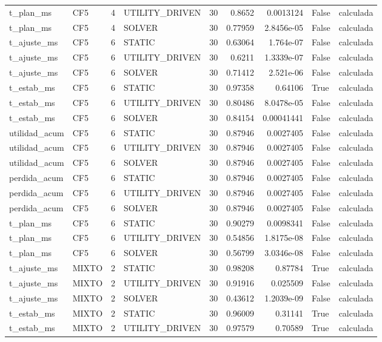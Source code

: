 \begin{tabular}{llrlrrrll}
t_plan_ms & CF5 & 4 & UTILITY_DRIVEN & 30 & 0.8652 & 0.0013124 & False & calculada \\
t_plan_ms & CF5 & 4 & SOLVER & 30 & 0.77959 & 2.8456e-05 & False & calculada \\
t_ajuste_ms & CF5 & 6 & STATIC & 30 & 0.63064 & 1.764e-07 & False & calculada \\
t_ajuste_ms & CF5 & 6 & UTILITY_DRIVEN & 30 & 0.6211 & 1.3339e-07 & False & calculada \\
t_ajuste_ms & CF5 & 6 & SOLVER & 30 & 0.71412 & 2.521e-06 & False & calculada \\
t_estab_ms & CF5 & 6 & STATIC & 30 & 0.97358 & 0.64106 & True & calculada \\
t_estab_ms & CF5 & 6 & UTILITY_DRIVEN & 30 & 0.80486 & 8.0478e-05 & False & calculada \\
t_estab_ms & CF5 & 6 & SOLVER & 30 & 0.84154 & 0.00041441 & False & calculada \\
utilidad_acum & CF5 & 6 & STATIC & 30 & 0.87946 & 0.0027405 & False & calculada \\
utilidad_acum & CF5 & 6 & UTILITY_DRIVEN & 30 & 0.87946 & 0.0027405 & False & calculada \\
utilidad_acum & CF5 & 6 & SOLVER & 30 & 0.87946 & 0.0027405 & False & calculada \\
perdida_acum & CF5 & 6 & STATIC & 30 & 0.87946 & 0.0027405 & False & calculada \\
perdida_acum & CF5 & 6 & UTILITY_DRIVEN & 30 & 0.87946 & 0.0027405 & False & calculada \\
perdida_acum & CF5 & 6 & SOLVER & 30 & 0.87946 & 0.0027405 & False & calculada \\
t_plan_ms & CF5 & 6 & STATIC & 30 & 0.90279 & 0.0098341 & False & calculada \\
t_plan_ms & CF5 & 6 & UTILITY_DRIVEN & 30 & 0.54856 & 1.8175e-08 & False & calculada \\
t_plan_ms & CF5 & 6 & SOLVER & 30 & 0.56799 & 3.0346e-08 & False & calculada \\
t_ajuste_ms & MIXTO & 2 & STATIC & 30 & 0.98208 & 0.87784 & True & calculada \\
t_ajuste_ms & MIXTO & 2 & UTILITY_DRIVEN & 30 & 0.91916 & 0.025509 & False & calculada \\
t_ajuste_ms & MIXTO & 2 & SOLVER & 30 & 0.43612 & 1.2039e-09 & False & calculada \\
t_estab_ms & MIXTO & 2 & STATIC & 30 & 0.96009 & 0.31141 & True & calculada \\
t_estab_ms & MIXTO & 2 & UTILITY_DRIVEN & 30 & 0.97579 & 0.70589 & True & calculada \\

\end{tabular}
